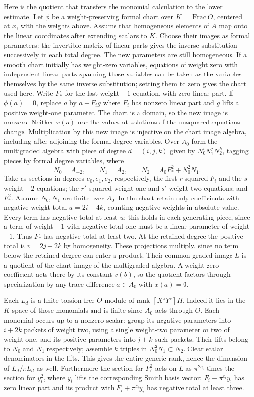 \documentclass[11pt]{amsart}
\theoremstyle{definition}
\theoremstyle{remark}
\begin{document}
Here is the quotient that transfers the monomial calculation to the
lower estimate. Let $\phi$ be a weight-preserving formal chart over
$K=\operatorname{Frac}O$, centered at $x$, with the weights above.
Assume that homogeneous elements of $A$ map onto the linear
coordinates after extending scalars to $K$. Choose their images
as formal parameters: the invertible matrix of linear parts gives
the inverse substitution successively in each total degree. The
new parameters are still homogeneous. If a smooth chart initially
has weight-zero variables, equations of weight zero with independent
linear parts spanning those variables can be taken as the variables
themselves by the same inverse substitution; setting them to zero
gives the chart used here. Write $F_*$ for the last weight $-1$
equation, with zero linear part. If $\phi(a)=0$, replace $a$ by
$a+F_i g$ where $F_i$ has nonzero linear part and $g$ lifts a
positive weight-one parameter. The chart is a domain, so the new
image is nonzero. Neither $x(a)$ nor the values at solutions of
the unsquared equations change. Multiplication by this new image
is injective on the chart image algebra, including after adjoining
the formal degree variables. Over $A_0$ form
the multigraded algebra with piece of degree $d=(i,j,k)$ given by
$N_0^iN_1^jN_2^k$, tagging pieces by formal degree variables, where
\[
 N_0=A_{-2},\qquad N_1=A_2,\qquad
 N_2=A_0F_*^2+N_0^2N_1.
\]
Take as sections in degrees $e_0,e_1,e_2$, respectively, the first
$r$ squared $F_i$ and the $s$ weight $-2$ equations; the $r'$
squared weight-one and $s'$ weight-two equations; and $F_*^2$.
Assume $N_0,N_1$ are finite over $A_0$. In the chart retain only
coefficients with negative weight total $u=2i+4k$, counting
negative weights in absolute value. Every term has negative total
at least $u$: this holds in each generating piece, since a term
of weight $-1$ with negative total one must be a linear parameter
of weight $-1$. Thus $F_*$ has negative total at least two.
At the retained degree the positive total is $v=2j+2k$ by homogeneity.
These projections multiply, since no term below the retained
degree can enter a product. Their common graded image $L$ is a
quotient of the chart image of the multigraded algebra. A
weight-zero coefficient acts there by its constant $x(b)$, so
the quotient factors through specialization by any trace difference
$a\in A_0$ with $x(a)=0$.

Each $L_d$ is a finite torsion-free $O$-module of rank
$[X^uY^v]H$. Indeed it lies in the $K$-space of those monomials
and is finite since $A_0$ acts through $O$. Each monomial occurs
up to a nonzero scalar: group its negative parameters into
$i+2k$ packets of weight two, using a single weight-two
parameter or two of weight one, and its positive parameters
into $j+k$ such packets. Their lifts belong to $N_0$ and $N_1$
respectively; assemble $k$ triples in $N_0^2N_1\subset N_2$.
Clear scalar denominators in the lifts. This gives the entire
generic rank, hence the dimension of $L_d/\pi L_d$ as well.
Furthermore the section for $F_i^2$ acts on $L$ as
$\pi^{2c_i}$ times the section for $y_i^2$, where $y_i$ lifts
the corresponding Smith basis vector: $F_i-\pi^{c_i}y_i$ has
zero linear part and its product with $F_i+\pi^{c_i}y_i$
has negative total at least three.
\end{document}
